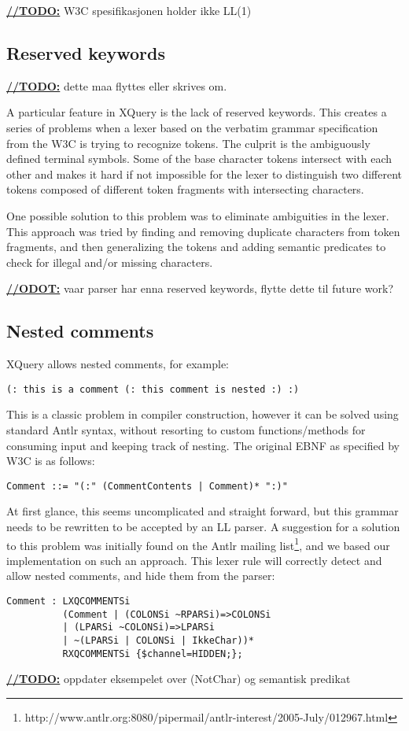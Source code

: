 \underline{\textbf{\LARGE //TODO:}} W3C spesifikasjonen holder ikke LL(1)

\subsection{Reserved keywords}

\underline{\textbf{\LARGE //TODO:}} dette maa flyttes eller skrives om.

A particular feature in XQuery is the lack of reserved keywords. This creates a
series of problems when a lexer based on the verbatim grammar specification from
the W3C is trying to recognize tokens. The culprit is the ambiguously defined
terminal symbols. Some of the base character tokens intersect with each other
and makes it hard if not impossible for the lexer to distinguish two different
tokens composed of different token fragments with intersecting characters.

One possible solution to this problem was to eliminate ambiguities in the lexer.
This approach was tried by finding and removing duplicate characters from token
fragments, and then generalizing the tokens and adding semantic predicates to
check for illegal and/or missing characters.

\underline{\textbf{\LARGE //ODOT:}} vaar parser har enna reserved keywords, flytte dette til future work?



\subsection{Nested comments}
XQuery allows nested comments, for example:
\begin{verbatim}
(: this is a comment (: this comment is nested :) :)
\end{verbatim}
This is a classic problem in compiler construction, however it can be solved
using standard Antlr syntax, without resorting to custom functions/methods for
consuming input and keeping track of nesting. The original EBNF as specified by
W3C is as follows:
\begin{verbatim}
Comment ::= "(:" (CommentContents | Comment)* ":)"
\end{verbatim}
At first glance, this seems uncomplicated and straight forward, but this grammar
needs to be rewritten to be accepted by an LL parser. A suggestion for a 
solution to this problem was initially found on the Antlr mailing
list\footnote{http://www.antlr.org:8080/pipermail/antlr-interest/2005-July/012967.html},
and we based our implementation on such an approach. This lexer rule will
correctly detect and allow nested comments, and hide them from the parser:
\begin{verbatim}	
Comment : LXQCOMMENTSi 
          (Comment | (COLONSi ~RPARSi)=>COLONSi 
          | (LPARSi ~COLONSi)=>LPARSi 
          | ~(LPARSi | COLONSi | IkkeChar))* 
          RXQCOMMENTSi {$channel=HIDDEN;};
\end{verbatim}

\underline{\textbf{\LARGE //TODO:}} oppdater eksempelet over (NotChar) og semantisk predikat